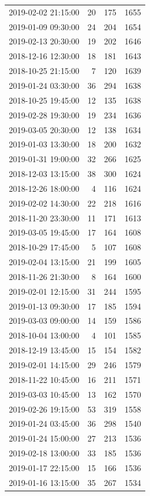 \begin{tabular}{lrrr}
2019-02-02 21:15:00 & 20 & 175 & 1655 \\
2019-01-09 09:30:00 & 24 & 204 & 1654 \\
2019-02-13 20:30:00 & 19 & 202 & 1646 \\
2018-12-16 12:30:00 & 18 & 181 & 1643 \\
2018-10-25 21:15:00 & 7 & 120 & 1639 \\
2019-01-24 03:30:00 & 36 & 294 & 1638 \\
2018-10-25 19:45:00 & 12 & 135 & 1638 \\
2019-02-28 19:30:00 & 19 & 234 & 1636 \\
2019-03-05 20:30:00 & 12 & 138 & 1634 \\
2019-01-03 13:30:00 & 18 & 200 & 1632 \\
2019-01-31 19:00:00 & 32 & 266 & 1625 \\
2018-12-03 13:15:00 & 38 & 300 & 1624 \\
2018-12-26 18:00:00 & 4 & 116 & 1624 \\
2019-02-02 14:30:00 & 22 & 218 & 1616 \\
2018-11-20 23:30:00 & 11 & 171 & 1613 \\
2019-03-05 19:45:00 & 17 & 164 & 1608 \\
2018-10-29 17:45:00 & 5 & 107 & 1608 \\
2019-02-04 13:15:00 & 21 & 199 & 1605 \\
2018-11-26 21:30:00 & 8 & 164 & 1600 \\
2019-02-01 12:15:00 & 31 & 244 & 1595 \\
2019-01-13 09:30:00 & 17 & 185 & 1594 \\
2019-03-03 09:00:00 & 14 & 159 & 1586 \\
2018-10-04 13:00:00 & 4 & 101 & 1585 \\
2018-12-19 13:45:00 & 15 & 154 & 1582 \\
2019-02-01 14:15:00 & 29 & 246 & 1579 \\
2018-11-22 10:45:00 & 16 & 211 & 1571 \\
2019-03-03 10:45:00 & 13 & 162 & 1570 \\
2019-02-26 19:15:00 & 53 & 319 & 1558 \\
2019-01-24 03:45:00 & 36 & 298 & 1540 \\
2019-01-24 15:00:00 & 27 & 213 & 1536 \\
2019-02-18 13:00:00 & 33 & 185 & 1536 \\
2019-01-17 22:15:00 & 15 & 166 & 1536 \\
2019-01-16 13:15:00 & 35 & 267 & 1534 \\

\end{tabular}
